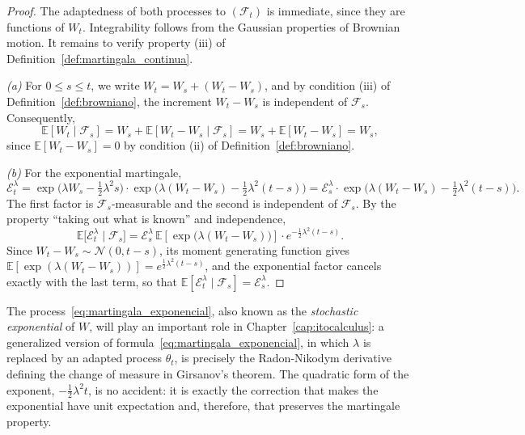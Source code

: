 \documentclass[11pt,a4paper,oneside]{report}
\theoremstyle{plain}
\theoremstyle{definition}
\theoremstyle{remark}
\newcommand{\E}{\mathbb{E}}
\newcommand{\F}{\mathcal{F}}
\newcommand{\1}{\mathbf{1}}
\begin{document}
\begin{proof}
The adaptedness of both processes to $(\F_t)$ is immediate, since they
are functions of $W_t$. Integrability follows from the Gaussian
properties of Brownian motion. It remains to verify property (iii) of
Definition~\ref{def:martingala_continua}.

\emph{(a)} For $0 \leq s \leq t$, we write $W_t = W_s + (W_t - W_s)$,
and by condition (iii) of Definition~\ref{def:browniano}, the
increment $W_t - W_s$ is independent of $\F_s$. Consequently,
\begin{equation*}
  \E[W_t \mid \F_s] = W_s + \E[W_t - W_s \mid \F_s]
                    = W_s + \E[W_t - W_s] = W_s,
\end{equation*}
since $\E[W_t - W_s] = 0$ by condition (ii) of
Definition~\ref{def:browniano}.

\emph{(b)} For the exponential martingale,
\begin{equation*}
  \mathcal{E}_t^{\lambda}
  = \exp\!\bigl(\lambda W_s - \tfrac{1}{2}\lambda^2 s\bigr)
    \cdot \exp\!\bigl(\lambda(W_t - W_s) - \tfrac{1}{2}\lambda^2(t - s)\bigr)
  = \mathcal{E}_s^{\lambda} \cdot
    \exp\!\bigl(\lambda(W_t - W_s) - \tfrac{1}{2}\lambda^2(t - s)\bigr).
\end{equation*}
The first factor is $\F_s$-measurable and the second is independent of
$\F_s$. By the property ``taking out what is known'' and independence,
\begin{equation*}
  \E\bigl[\mathcal{E}_t^{\lambda} \mid \F_s\bigr]
  = \mathcal{E}_s^{\lambda}\,
    \E\!\left[\exp\!\bigl(\lambda(W_t - W_s)\bigr)\right]
    \cdot e^{-\frac{1}{2}\lambda^2(t-s)}.
\end{equation*}
Since $W_t - W_s \sim \mathcal{N}(0, t-s)$, its moment generating
function gives
$\E[\exp(\lambda(W_t-W_s))] = e^{\frac{1}{2}\lambda^2(t-s)}$, and the
exponential factor cancels exactly with the last term, so that
$\E[\mathcal{E}_t^{\lambda} \mid \F_s] = \mathcal{E}_s^{\lambda}$.
\end{proof}

The
process~\eqref{eq:martingala_exponencial}, also known as the
\emph{stochastic exponential} of $W$, will play an important role in
Chapter~\ref{cap:itocalculus}: a generalized version of
formula~\eqref{eq:martingala_exponencial}, in which $\lambda$ is
replaced by an adapted process $\theta_t$, is precisely the
Radon-Nikodym derivative defining the change of measure in
Girsanov's theorem. The quadratic form of the exponent,
$-\tfrac{1}{2}\lambda^2 t$, is no accident: it is exactly the
correction that makes the exponential have unit expectation and,
therefore, that preserves the martingale property.
\end{document}
